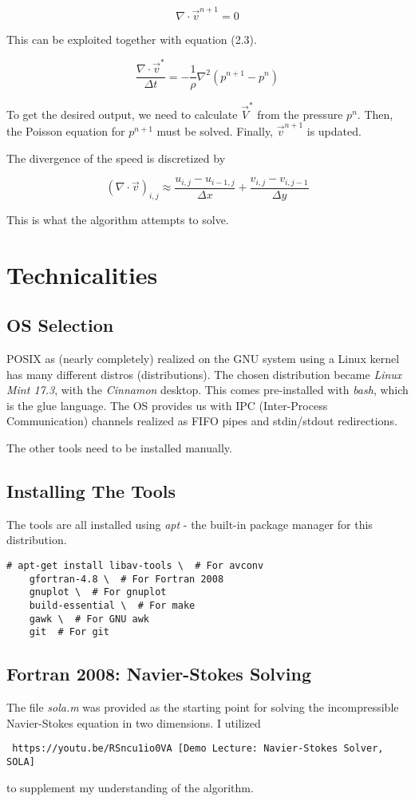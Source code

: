 \documentclass[listof=totoc]{report}
\begin{document}
$$ \nabla \cdot \vec{v}^{n+1} = 0 $$

This can be exploited together with equation (2.3).

\begin{equation}
\frac{\nabla \cdot \vec{v}^*}{\Delta t} = -\frac{1}{\rho} \nabla^2 (p^{n+1} - p^{n})
\end{equation}

To get the desired output, we need to calculate $\vec{V}^*$ from the pressure $p^n$.
Then, the Poisson equation for $p^{n+1}$ must be solved.
Finally, $\vec{v}^{n+1}$ is updated.

The divergence of the speed is discretized by

$$ (\nabla \cdot \vec{v})_{i,j} \approx \frac{u_{i,j} - u_{i-1,j}}{\Delta x} + \frac{v_{i,j} - v_{i,j-1}}{\Delta y} $$

This is what the algorithm attempts to solve.


\chapter{Technicalities}
\section{OS Selection}
POSIX as (nearly completely) realized on the GNU system using a Linux kernel has many different distros (distributions). The chosen distribution became \emph{Linux Mint 17.3}, with the \emph{Cinnamon} desktop. This comes pre-installed with \emph{bash}, which is the glue language. The OS provides us with IPC (Inter-Process Communication) channels realized as FIFO pipes and stdin/stdout redirections.

The other tools need to be installed manually.

\section{Installing The Tools}
The tools are all installed using \emph{apt} - the built-in package manager for this distribution.

\begin{verbatim}
# apt-get install libav-tools \  # For avconv
    gfortran-4.8 \  # For Fortran 2008
    gnuplot \  # For gnuplot
    build-essential \  # For make
    gawk \  # For GNU awk
    git  # For git
\end{verbatim}

\section{Fortran 2008: Navier-Stokes Solving}
The file \emph{sola.m} was provided as the starting point for solving the incompressible Navier-Stokes equation in two dimensions.
I utilized \begin{verbatim} https://youtu.be/RSncu1io0VA [Demo Lecture: Navier-Stokes Solver, SOLA] \end{verbatim} to supplement my understanding of the algorithm.
\end{document}
